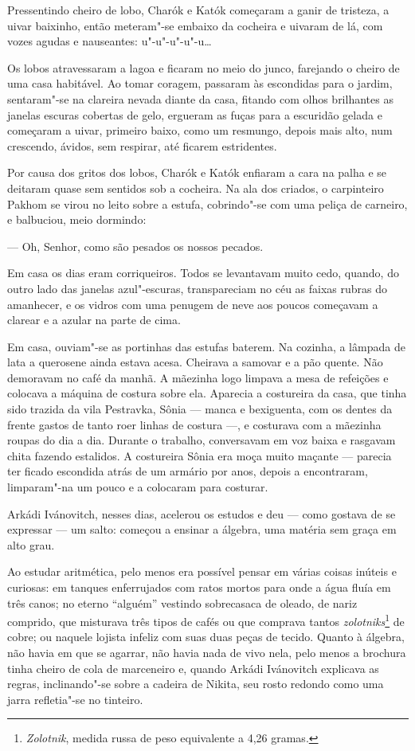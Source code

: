 Pressentindo cheiro de lobo, Charók e Katók começaram a ganir de
tristeza, a uivar baixinho, então meteram"-se embaixo da cocheira e
uivaram de lá, com vozes agudas e nauseantes: u"-u"-u"-u"-u\ldots{}

Os lobos atravessaram a lagoa e ficaram no meio do junco, farejando o
cheiro de uma casa habitável. Ao tomar coragem, passaram às escondidas
para o jardim, sentaram"-se na clareira nevada diante da casa, fitando
com olhos brilhantes as janelas escuras cobertas de gelo, ergueram as
fuças para a escuridão gelada e começaram a uivar, primeiro baixo, como
um resmungo, depois mais alto, num crescendo, ávidos, sem respirar, até
ficarem estridentes.

Por causa dos gritos dos lobos, Charók e Katók enfiaram a cara na palha e
se deitaram quase sem sentidos sob a cocheira. Na ala dos criados, o
carpinteiro Pakhom se virou no leito sobre a estufa, cobrindo"-se com uma
peliça de carneiro, e balbuciou, meio dormindo:

--- Oh, Senhor, como são pesados os nossos pecados.

Em casa os dias eram corriqueiros. Todos se levantavam muito cedo,
quando, do outro lado das janelas azul"-escuras, transpareciam no céu as
faixas rubras do amanhecer, e os vidros com uma penugem de neve aos
poucos começavam a clarear e a azular na parte de cima.

Em casa, ouviam"-se as portinhas das estufas baterem. Na cozinha, a
lâmpada de lata a querosene ainda estava acesa. Cheirava a samovar e a
pão quente. Não demoravam no café da manhã. A mãezinha logo limpava a
mesa de refeições e colocava a máquina de costura sobre ela. Aparecia a
costureira da casa, que tinha sido trazida da vila Pestravka, Sônia ---
manca e bexiguenta, com os dentes da frente gastos de tanto roer linhas
de costura ---, e costurava com a mãezinha roupas do dia a dia.
Durante o trabalho, conversavam em voz baixa e rasgavam chita fazendo
estalidos. A costureira Sônia era moça muito maçante --- parecia ter
ficado escondida atrás de um armário por anos, depois a encontraram,
limparam"-na um pouco e a colocaram para costurar.

Arkádi Ivánovitch, nesses dias, acelerou os estudos e deu --- como
gostava de se expressar --- um salto: começou a ensinar a álgebra, uma
matéria sem graça em alto grau.

Ao estudar aritmética, pelo menos era possível pensar em várias coisas
inúteis e curiosas: em tanques enferrujados com ratos mortos para onde a
água fluía em três canos; no eterno ``alguém'' vestindo sobrecasaca de
oleado, de nariz comprido, que misturava três tipos de cafés ou que
comprava tantos \emph{zolotniks}\footnote{\emph{Zolotnik}, medida russa de
  peso equivalente a 4,26 gramas.} de cobre; ou naquele lojista infeliz
com suas duas peças de tecido. Quanto à álgebra, não havia em que se
agarrar, não havia nada de vivo nela, pelo menos a brochura tinha cheiro
de cola de marceneiro e, quando Arkádi Ivánovitch explicava as regras,
inclinando"-se sobre a cadeira de Nikita, seu rosto redondo como uma
jarra refletia"-se no tinteiro.

